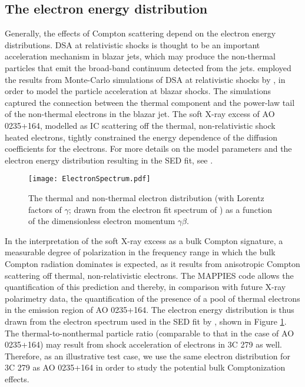 \documentclass[twocolumn, tighten, twocolappendix]{aastex63}
\begin{document}
\subsection{The electron energy distribution}\label{sec:Electrons}
Generally, the effects of Compton scattering depend on the electron energy distributions. DSA at relativistic shocks is thought to be an important acceleration mechanism in blazar jets, which may produce the non-thermal particles that emit the broad-band continuum detected from the jets. \cite{Baring_etal2017} employed the results from Monte-Carlo simulations of DSA at relativistic shocks by \cite{Summerlin_Baring_2012}, in order to model the particle acceleration at blazar shocks. The simulations captured the connection between the thermal component and the power-law tail of the non-thermal electrons in the blazar jet. The soft X-ray excess of AO 0235+164, modelled as IC scattering off the thermal, non-relativistic shock heated electrons, tightly constrained the energy dependence of the diffusion coefficients for the electrons. For more details on the model parameters and the electron energy distribution resulting in the SED fit, see \cite{Baring_etal2017}. 

\begin{figure}[ht!]
\texttt{[image: ElectronSpectrum.pdf]}
\caption{The thermal and non-thermal electron distribution (with Lorentz factors of $\gamma$; drawn from the electron fit spectrum of \cite{Baring_etal2017}) as a function of the dimensionless electron momentum $\gamma\beta$. \label{fig:elecDist}}
\end{figure}
In the interpretation of the soft X-ray excess as a bulk Compton signature, a measurable degree of polarization in the frequency range in which the bulk Compton radiation dominates is expected, as it results from anisotropic Compton scattering off thermal, non-relativistic electrons. The MAPPIES code allows the quantification of this prediction and thereby, in comparison with future X-ray polarimetry data, the quantification of the presence of a pool of thermal electrons in the emission region of AO 0235+164. The electron energy distribution is thus drawn from the electron spectrum used in the SED fit by \cite{Baring_etal2017}, shown in Figure \ref{fig:elecDist}. The thermal-to-nonthermal particle ratio (comparable to that in the case of AO 0235+164) may result from shock acceleration of electrons in 3C 279 as well. Therefore, as an illustrative test case, we use the same electron distribution for 3C 279 as AO 0235+164 in order to study the potential bulk Comptonization effects.
\end{document}
